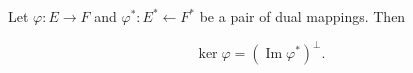 Let $\varphi: E \rightarrow F$ and $\varphi^*: E^* \leftarrow F^*$ be a pair of dual mappings. Then

$$\ker \varphi = (\operatorname{Im} \varphi^*)^\perp.$$
